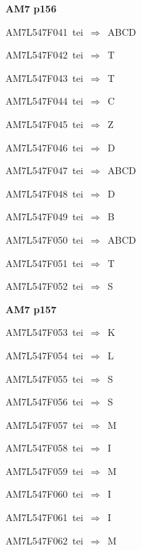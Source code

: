 \par\vfill\eject
{\bf\hfill AM7 p156\hfill\hbox{}}\par\bigskip
{\sixrm AM7L547F041\ {\sixit tei}\ }$\Rightarrow$\ ABCD\par\smallskip
{\sixrm AM7L547F042\ {\sixit tei}\ }$\Rightarrow$\ T\par\smallskip
{\sixrm AM7L547F043\ {\sixit tei}\ }$\Rightarrow$\ T\par\smallskip
{\sixrm AM7L547F044\ {\sixit tei}\ }$\Rightarrow$\ C\par\smallskip
{\sixrm AM7L547F045\ {\sixit tei}\ }$\Rightarrow$\ Z\par\smallskip
{\sixrm AM7L547F046\ {\sixit tei}\ }$\Rightarrow$\ D\par\smallskip
{\sixrm AM7L547F047\ {\sixit tei}\ }$\Rightarrow$\ ABCD\par\smallskip
{\sixrm AM7L547F048\ {\sixit tei}\ }$\Rightarrow$\ D\par\smallskip
{\sixrm AM7L547F049\ {\sixit tei}\ }$\Rightarrow$\ B\par\smallskip
{\sixrm AM7L547F050\ {\sixit tei}\ }$\Rightarrow$\ ABCD\par\smallskip
{\sixrm AM7L547F051\ {\sixit tei}\ }$\Rightarrow$\ T\par\smallskip
{\sixrm AM7L547F052\ {\sixit tei}\ }$\Rightarrow$\ S\par\smallskip

\par\vfill\eject
{\bf\hfill AM7 p157\hfill\hbox{}}\par\bigskip
{\sixrm AM7L547F053\ {\sixit tei}\ }$\Rightarrow$\ K\par\smallskip
{\sixrm AM7L547F054\ {\sixit tei}\ }$\Rightarrow$\ L\par\smallskip
{\sixrm AM7L547F055\ {\sixit tei}\ }$\Rightarrow$\ S\par\smallskip
{\sixrm AM7L547F056\ {\sixit tei}\ }$\Rightarrow$\ S\par\smallskip
{\sixrm AM7L547F057\ {\sixit tei}\ }$\Rightarrow$\ M\par\smallskip
{\sixrm AM7L547F058\ {\sixit tei}\ }$\Rightarrow$\ I\par\smallskip
{\sixrm AM7L547F059\ {\sixit tei}\ }$\Rightarrow$\ M\par\smallskip
{\sixrm AM7L547F060\ {\sixit tei}\ }$\Rightarrow$\ I\par\smallskip
{\sixrm AM7L547F061\ {\sixit tei}\ }$\Rightarrow$\ I\par\smallskip
{\sixrm AM7L547F062\ {\sixit tei}\ }$\Rightarrow$\ M\par\smallskip

